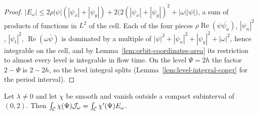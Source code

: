 \begin{proof}
\leanok
$|E_\omega|\le2\rho|\psi|(|\psi_x|+|\psi_y|)+2\bigl(2(|\psi_x|+|\psi_y|)^2+|\omega||\psi|\bigr)$, a sum of
products of functions in $L^2$ of the cell. Each of the four pieces
$\rho\operatorname{Re}(\psi\overline{\psi_n})$, $|\psi_n|^2$, $|\psi_t|^2$, $\operatorname{Re}(\omega\bar\psi)$
is dominated by a multiple of $|\psi|^2+|\psi_x|^2+|\psi_y|^2+|\omega|^2$, hence integrable on
the cell, and by Lemma~\ref{lem:orbit-coordinates-area} its restriction to almost every level is
integrable in flow time. On the level $\Psi=2h$ the factor $2-\Psi$ is $2-2h$, so the level
integral splits (Lemma~\ref{lem:level-integral-congr} for the period interval).
\end{proof}

\begin{lemma}
\label{lem:ee-cutoff-identity}
\leanok
Let $\lambda\ne0$ and let $\chi$ be smooth and vanish outside a compact subinterval of
$(0,2)$. Then $\int_{\mathcal{C}}\chi(\Psi)\mathcal J_\omega=\int_{\mathcal{C}}\chi'(\Psi)E_\omega$.
\end{lemma}

